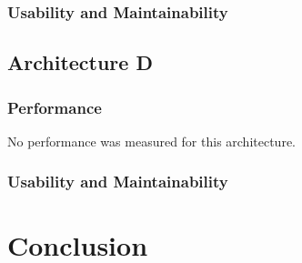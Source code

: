 \documentclass{article}
\begin{document}
\subsubsection{Usability and Maintainability}

\subsection{Architecture D}
\subsubsection{Performance}
No performance was measured for this architecture.

\subsubsection{Usability and Maintainability}

\section{Conclusion}
\end{document}
